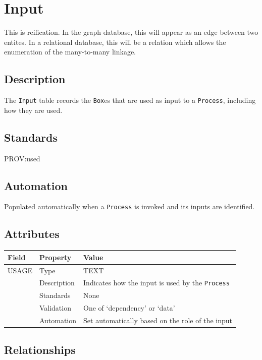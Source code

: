 \documentclass[
]{article}
\newcounter{none}
\begin{document}
\section{Input}\label{input}

This is reification. In the graph database, this will appear as an edge
between two entites. In a relational database, this will be a relation
which allows the enumeration of the many-to-many linkage.

\subsection{Description}\label{description-15}

The \texttt{Input} table records the \texttt{Box}es that are used as
input to a \texttt{Process}, including how they are used.

\subsection{Standards}\label{standards-17}

PROV:used

\subsection{Automation}\label{automation-17}

Populated automatically when a \texttt{Process} is invoked and its
inputs are identified.

\subsection{Attributes}\label{attributes-15}

{\def\LTcaptype{none} 
\begin{longtable}[]{@{}lll@{}}
\toprule\noalign{}
Field & Property & Value \\
\midrule\noalign{}
\endhead
\bottomrule\noalign{}
\endlastfoot
USAGE & Type & TEXT \\
& Description & Indicates how the input is used by the
\texttt{Process} \\
& Standards & None \\
& Validation & One of `dependency' or `data' \\
& Automation & Set automatically based on the role of the input \\
\end{longtable}
}

\subsection{Relationships}\label{relationships-13}
\end{document}
